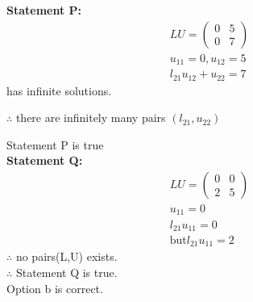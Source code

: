 \documentclass[journal]{IEEEtran}
\begin{document}
\textbf{Statement P:}
\begin{align}
LU = \begin{pmatrix} 0 & 5 \\ 0 & 7 \end{pmatrix} \\
u_{11} = 0, u_{12} = 5\\
l_{21}u_{12} + u_{22} = 7
\end{align}
has infinite solutions.

$\therefore$ there are infinitely many pairs $(l_{21}, u_{22})$

Statement P is true\\

\textbf{Statement Q:}
\begin{align}
LU = \begin{pmatrix} 0 & 0 \\ 2 & 5 \end{pmatrix}\\
u_{11} = 0\\
l_21u_11=0\\
\text{but} l_21u_11=2
\end{align}
$\therefore$ no pairs(L,U) exists.\\
$\therefore$ Statement Q is true.\\
Option b is correct.
\end{document}
